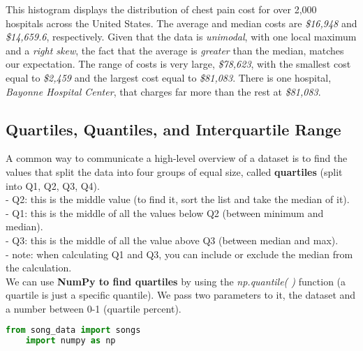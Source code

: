 \documentclass[11pt, a4paper]{article}
\begin{document}
\begin{spacing}{1.1}
\begin{minipage}[c]{8cm}
	\end{minipage}
	\begin{minipage}[c]{9.5cm}
	This histogram displays the distribution of chest pain cost for over 2,000 hospitals across the United States. The average and median costs are \textit{\$16,948} and \textit{\$14,659.6}, respectively. Given that the data is \textit{unimodal}, with one local maximum and a \textit{right skew}, the fact that the average is \textit{greater} than the median, matches our expectation. The range of costs is very large, \textit{\$78,623}, with the smallest cost equal to \textit{\$2,459} and the largest cost equal to \textit{\$81,083}. There is one hospital, \textit{Bayonne Hospital Center}, that charges far more than the rest at \textit{\$81,083}.
	\end{minipage} \vspace*{4mm}

	\subsection{Quartiles, Quantiles, and Interquartile Range}
	A common way to communicate a high-level overview of a dataset is to find the values that split the data into four groups of equal size, called \textbf{quartiles} (split into Q1, Q2, Q3, Q4). \\
	\hspace*{3mm} - Q2: this is the middle value (to find it, sort the list and take the median of it). \\
	\hspace*{3mm} - Q1: this is the middle of all the values below Q2 (between minimum and median). \\
	\hspace*{3mm} - Q3: this is the middle of all the value above Q3 (between median and max). \\
	\hspace*{3mm} - note: when calculating Q1 and Q3, you can include or exclude the median from the calculation. \vspace*{2mm} \\
	We can use \textbf{NumPy to find quartiles} by using the \textit{np.quantile( )} function (a quartile is just a specific quantile). We pass two parameters to it, the dataset and a number between 0-1 (quartile percent). 
	\begin{lstlisting}[language=Python]
	from song_data import songs
	import numpy as np
	

\end{lstlisting}
\end{spacing}
\end{document}
